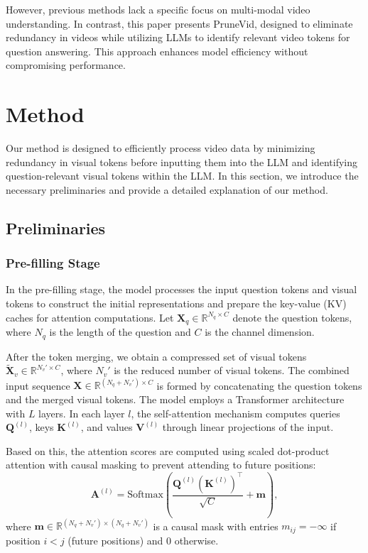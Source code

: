 \documentclass{article} %
\begin{document}

However, previous methods lack a specific focus on multi-modal video understanding. In contrast, this paper presents PruneVid, designed to eliminate redundancy in videos while utilizing LLMs to identify relevant video tokens for question answering. This approach enhances model efficiency without compromising performance.

\section{Method}
\label{sec:method}

Our method is designed to efficiently process video data by minimizing redundancy in visual tokens before inputting them into the LLM and identifying question-relevant visual tokens within the LLM. In this section, we introduce the necessary preliminaries and provide a detailed explanation of our method.

\subsection{Preliminaries}

\subsubsection{Pre-filling Stage}

In the pre-filling stage, the model processes the input question tokens and visual tokens to construct the initial representations and prepare the key-value (KV) caches for attention computations. Let $\bm{X}_q \in \mathbb{R}^{N_q \times C}$ denote the question tokens, where $N_q$ is the length of the question and $C$ is the channel dimension.

After the token merging, we obtain a compressed set of visual tokens $\tilde{\bm{X}}_v \in \mathbb{R}^{N_v' \times C}$, where $N_v'$ is the reduced number of visual tokens. The combined input sequence $\bm{X} \in \mathbb{R}^{(N_q + N_v') \times C}$ is formed by concatenating the question tokens and the merged visual tokens. The model employs a Transformer architecture with $L$ layers. In each layer $l$, the self-attention mechanism computes queries $\bm{Q}^{(l)}$, keys $\bm{K}^{(l)}$, and values $\bm{V}^{(l)}$ through linear projections of the input.

Based on this, the attention scores are computed using scaled dot-product attention with causal masking to prevent attending to future positions:
\begin{equation}
    \label{eq:attention_formula}
    \bm{A}^{(l)} = \text{Softmax} \left( \frac{\bm{Q}^{(l)} (\bm{K}^{(l)})^\top}{\sqrt{C}} + \bm{m} \right),
\end{equation}
where $\bm{m} \in \mathbb{R}^{(N_q + N_v') \times (N_q + N_v')}$ is a causal mask with entries $m_{ij} = -\infty$ if position $i < j$ (future positions) and $0$ otherwise.
\end{document}
